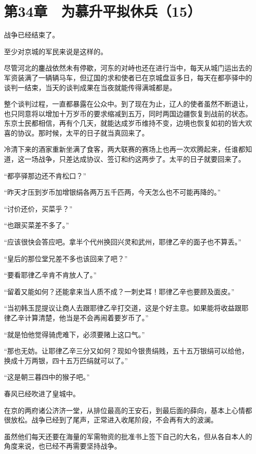 \section{第34章　为慕升平拟休兵（15）}

战争已经结束了。

至少对京城的军民来说是这样的。

尽管河北的鏖战依然未有停歇，河东的对峙也还在进行当中，每天从城门运出去的军资装满了一辆辆马车，但辽国的求和使者已在京城盘亘多日，每天在都亭驿中的谈判一结束，当天的谈判成果在当夜就能传得满城都是。

整个谈判过程，一直都暴露在公众中。到了现在为止，辽人的使者虽然不断退让，也只同意将以增加十万岁币的要求缩减到五万，同时两国边疆恢复到战前的状态。东京士民都相信，再有个几天，就能达成岁币维持不变，边境也恢复如初的皆大欢喜的协议。那时候，太平的日子就当真回来了。

冷清下来的酒家重新坐满了食客，两大联赛的赛场上也再一次欢腾起来，任谁都知道，这一场战争，只差达成协议、签订和约这两步了。太平的日子就要回来了。

“都亭驿那边还不肯松口？”

“昨天才压到岁币加增银绢各两万五千匹两，今天怎么也不可能再降的。”

“讨价还价，买菜乎？”

“也跟买菜差不多了。”

“应该很快会答应吧。拿半个代州换回兴灵和武州，耶律乙辛的面子也不算丢。”

“皇后的那位堂兄差不多也该回来了吧？”

“要看耶律乙辛肯不肯放人了。”

“留着又能如何？还能拿来当人质不成？一刺史耳！耶律乙辛也要顾及面皮。”

“当初韩玉昆提议让商人去跟耶律乙辛打交道，这是个好主意。如果能将收益跟耶律乙辛计算清楚，他当是不会再闹着要岁币了。”

“就是怕他觉得骑虎难下，必须要赌上这口气。”

“那也无妨。让耶律乙辛三分又如何？现如今银贵绢贱，五十五万银绢可以给他，换成十万两银，四十五万匹绢就可以了。”

“这是朝三暮四中的猴子吧。”

春风已经吹进了皇城中。

在京的两府诸公济济一堂，从排位最高的王安石，到最后面的薛向，基本上心情都很放松。战争已经到了尾声，正常进入收尾阶段，不会再有大的波澜。

虽然他们每天还要在海量的军需物资的批准书上签下自己的大名，但从各自本人的角度来说，也已经不再需要坚持战争。

